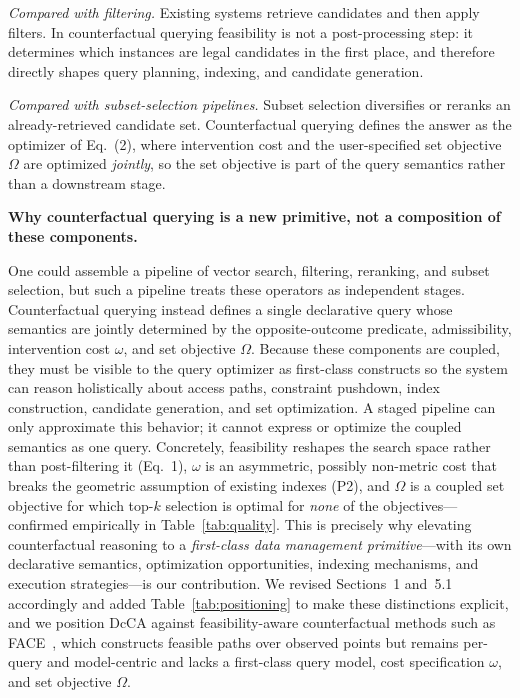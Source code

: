 \emph{Compared with filtering.} Existing systems retrieve candidates and then apply filters. In counterfactual querying feasibility is not a post-processing step: it determines which instances are legal candidates in the first place, and therefore directly shapes query planning, indexing, and candidate generation.

\emph{Compared with subset-selection pipelines.} Subset selection diversifies or reranks an already-retrieved candidate set. Counterfactual querying defines the answer as the optimizer of Eq.~(2), where intervention cost and the user-specified set objective $\Omega$ are optimized \emph{jointly}, so the set objective is part of the query semantics rather than a downstream stage.

\textbf{Why counterfactual querying is a new primitive, not a composition of these components.}

One could assemble a pipeline of vector search, filtering, reranking, and subset selection, but such a pipeline treats these operators as independent stages. Counterfactual querying instead defines a single declarative query whose semantics are jointly determined by the opposite-outcome predicate, admissibility, intervention cost $\omega$, and set objective $\Omega$. Because these components are coupled, they must be visible to the query optimizer as first-class constructs so the system can reason holistically about access paths, constraint pushdown, index construction, candidate generation, and set optimization. A staged pipeline can only approximate this behavior; it cannot express or optimize the coupled semantics as one query. Concretely, feasibility reshapes the search space rather than post-filtering it (Eq.~1), $\omega$ is an asymmetric, possibly non-metric cost that breaks the geometric assumption of existing indexes (P2), and $\Omega$ is a coupled set objective for which top-$k$ selection is optimal for \emph{none} of the objectives---confirmed empirically in Table~\ref{tab:quality}. This is precisely why elevating counterfactual reasoning to a \emph{first-class data management primitive}---with its own declarative semantics, optimization opportunities, indexing mechanisms, and execution strategies---is our contribution. We revised Sections~1 and~5.1 accordingly and added Table~\ref{tab:positioning} to make these distinctions explicit, and we position DcCA against feasibility-aware counterfactual methods such as FACE~\cite{poyiadzi2020face}, which constructs feasible paths over observed points but remains per-query and model-centric and lacks a first-class query model, cost specification $\omega$, and set objective $\Omega$.

